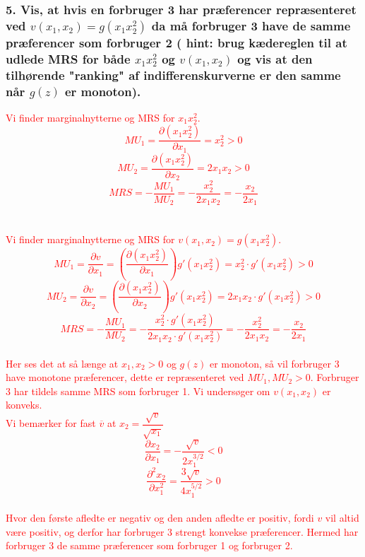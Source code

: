 \documentclass[a4paper, 12pt]{article}
\begin{document}
\subsubsection*{5. Vis, at hvis en forbruger 3 har præferencer repræsenteret ved $v(x_{1},x_{2}) = g(x_{1}x_{2}^{2})$ da må forbruger 3 have de samme præferencer som forbruger 2 ( hint: brug kædereglen til at udlede MRS for både $x_{1}x_{2}^{2}$ og $v(x_{1},x_{2})$ og vis at den tilhørende "ranking" af indifferenskurverne er den samme når $g(z)$ er monoton).}
\textcolor{red}{Vi finder marginalnytterne og MRS for $x_{1}x_{2}^{2}$.}
\textcolor{red}{$$MU_{1} = \dfrac{\partial (x_{1}x_{2}^{2})}{\partial x_{1}} = x_{2}^{2} > 0$$}
\textcolor{red}{$$MU_{2} = \dfrac{\partial (x_{1}x_{2}^{2})}{\partial x_{2}} = 2x_{1}x_{2} > 0$$}
\textcolor{red}{$$MRS = - \dfrac{MU_{1}}{MU_{2}} = -\dfrac{x_{2}^{2}}{2x_{1}x_{2}} = -\dfrac{x_{2}}{2x_{1}}$$}
\\\\
\textcolor{red}{Vi finder marginalnytterne og MRS for $v(x_{1},x_{2}) = g(x_{1}x_{2}^{2})$.}
\textcolor{red}{$$MU_{1} = \dfrac{\partial v}{\partial x_{1}} = \left( \dfrac{\partial (x_{1}x_{2}^{2})}{\partial x_{1}} \right) g'(x_{1}x_{2}^{2}) = x_{2}^{2} \cdot  g'(x_{1}x_{2}^{2}) > 0$$}
\textcolor{red}{$$MU_{2} = \dfrac{\partial v}{\partial x_{2}} =  \left( \dfrac{\partial (x_{1}x_{2}^{2})}{\partial x_{2}} \right) g'(x_{1}x_{2}^{2}) = 2x_{1}x_{2} \cdot g'(x_{1}x_{2}^{2}) > 0 $$}
\textcolor{red}{$$MRS = - \dfrac{MU_{1}}{MU_{2}} = -\dfrac{x_{2}^{2} \cdot  g'(x_{1}x_{2}^{2})}{2x_{1}x_{2} \cdot g'(x_{1}x_{2}^{2})} = -\dfrac{x_{2}^{2}}{2x_{1}x_{2}} = - \dfrac{x_{2}}{2x_{1}}$$}
\\
\textcolor{red}{Her ses det at så længe at $x_{1}, x_{2} > 0$ og $g(z)$ er monoton, så vil forbruger 3 have monotone præferencer, dette er repræsenteret ved $MU_{1},MU_{2} > 0$. Forbruger 3 har tildels samme MRS som forbruger 1.}
\textcolor{red}{Vi undersøger om $v(x_{1},x_{2})$ er konveks.}
\\
\textcolor{red}{Vi bemærker for fast $\overline{v}$ at $x_{2} = \dfrac{\sqrt{v}}{\sqrt{x_{1}}}$ }
\textcolor{red}{$$\dfrac{\partial x_{2}}{\partial x_{1}} = - \dfrac{ \sqrt{v}}{2x_{1}^{3/2}} < 0$$}
\textcolor{red}{$$\dfrac{\partial ^{2} x_{2}}{\partial x_{1}^{2}} = \dfrac{ 3\sqrt{v}}{4x_{1}^{5/2}} > 0 $$}
\\
\textcolor{red}{Hvor den første afledte er negativ og den anden afledte er positiv, fordi $v$ vil altid være positiv, og derfor har forbruger 3 strengt konvekse præferencer. Hermed har forbruger 3 de samme præferencer som forbruger 1 og forbruger 2.}
\end{document}
